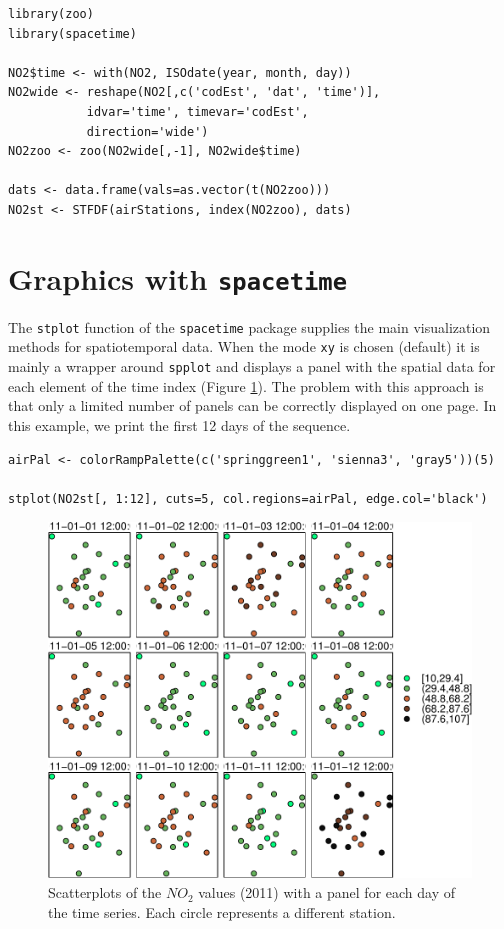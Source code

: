 \documentclass[smallroyalvopaper]{memoir}
\begin{document}

\lstset{language=R,numbers=none}
\begin{lstlisting}
library(zoo)
library(spacetime)

NO2$time <- with(NO2, ISOdate(year, month, day))
NO2wide <- reshape(NO2[,c('codEst', 'dat', 'time')],
		   idvar='time', timevar='codEst',
		   direction='wide')
NO2zoo <- zoo(NO2wide[,-1], NO2wide$time)

dats <- data.frame(vals=as.vector(t(NO2zoo)))
NO2st <- STFDF(airStations, index(NO2zoo), dats)
\end{lstlisting}
\section{Graphics with \texttt{spacetime}}
\label{sec-3}
The \texttt{stplot} function of the \texttt{spacetime} package supplies the main
visualization methods for spatiotemporal data. When the mode \texttt{xy} is
chosen (default) it is mainly a wrapper around \texttt{spplot} and displays a
panel with the spatial data for each element of the time index (Figure
\ref{fig:NO2STxy}). The problem with this approach is that only a limited
number of panels can be correctly displayed on one page. In this
example, we print the first 12 days of the sequence.


\lstset{language=R,numbers=none}
\begin{lstlisting}
airPal <- colorRampPalette(c('springgreen1', 'sienna3', 'gray5'))(5)

stplot(NO2st[, 1:12], cuts=5, col.regions=airPal, edge.col='black')
\end{lstlisting}

\begin{figure}[htb]
\centering
\includegraphics[width=.9\linewidth]{figs/NO2STxy.pdf}
\caption{\label{fig:NO2STxy}Scatterplots of the $NO_2$ values (2011) with a panel for each day of the time series. Each circle represents a different station.}
\end{figure}
\end{document}
